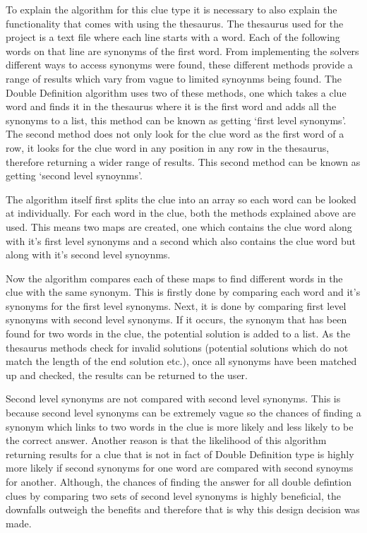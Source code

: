 To explain the algorithm for this clue type it is necessary to 
also explain the functionality that comes with using the thesaurus. 
The thesaurus used for the project is a text file where each line starts
 with a word. Each of the following words on that line are synonyms of 
the first word. From implementing the solvers different ways to access 
synonyms were found, these different methods provide a range of 
results which vary from vague to limited synoynms being found.
 The Double Definition algorithm uses two of these methods, one 
which takes a clue word and finds it in the thesaurus where it is the 
first word and adds all the synonyms to a list, this method can be known 
as getting `first level synonyms'. The second method does not only look 
for the clue word as the first word of a row, it looks 
for the clue word in any position in any row in the thesaurus, therefore 
returning a wider range of results. This second method can be known as
getting `second level synoynms'.

The algorithm itself first splits the clue into an array so each word 
can be looked at individually. For each word in the clue, both the 
methods explained above are used. This means two maps are created,
 one which contains the clue word along with it's first level synonyms 
and a second which also contains the clue word but along with it's 
second level synoynms. 

Now the algorithm compares each of these maps to find different words 
in the clue with the same synonym. This is firstly done by comparing 
each word and it's synonyms for the first level synonyms. Next, it is done 
by comparing first level synonyms with second level synonyms. If it occurs,
 the synonym that has been found for two words in the clue, the potential 
solution is added to a list. As the thesaurus methods check for invalid solutions
 (potential solutions which do not match the length of the  end solution etc.), 
once all synonyms have been matched up and checked, the results can 
be returned to the user. 

Second level synonyms are not compared with second level synonyms. 
This is because second level synonyms can be extremely vague so the 
chances of finding a synonym which links to two words in the clue is 
more likely and less likely to be the correct answer. Another reason is 
that the likelihood of this algorithm returning results for a clue that 
is not in fact of Double Definition type is highly more likely if second 
synonyms for one word are compared with second synoyms for 
another. Although, the chances of finding the answer for all double 
defintion clues by comparing two sets of second level synonyms is 
highly beneficial, the downfalls outweigh the benefits and therefore 
that is why this design decision was made. 

